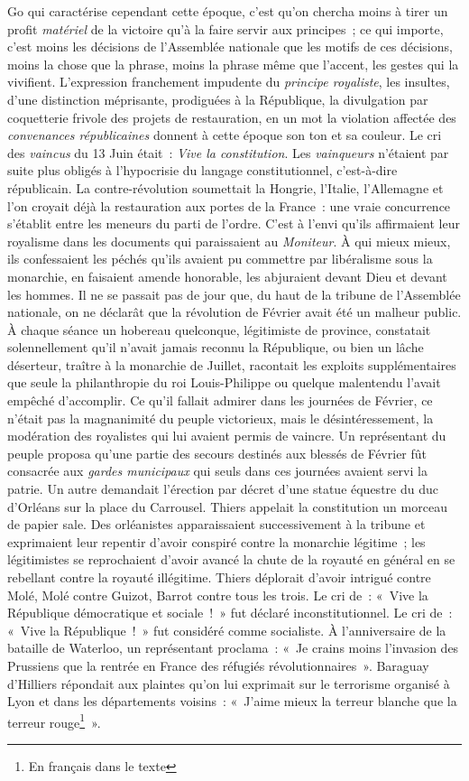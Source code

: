 \documentclass[twoside]{book} %
\begin{document}
Go qui caractérise cependant cette époque, c’est qu’on chercha moins à tirer un profit \emph{matériel} de la victoire qu’à la faire servir aux principes ; ce qui importe, c’est moins les décisions de l’Assemblée nationale que les motifs de ces décisions, moins la chose que la phrase, moins la phrase même que l’accent, les gestes qui la vivifient. L’expression franchement impudente du \emph{principe royaliste}, les insultes, d’une distinction méprisante, prodiguées à la République, la divulgation par coquetterie frivole des projets de restauration, en un mot la violation affectée des \emph{convenances républicaines} donnent à cette époque son ton et sa couleur. Le cri des \emph{vaincus} du 13 Juin était : \emph{Vive la constitution}. Les \emph{vainqueurs} n’étaient par suite plus obligés à l’hypocrisie du langage constitutionnel, c’est-à-dire républicain. La contre-révolution soumettait la Hongrie, l’Italie, l’Allemagne et l’on croyait déjà la restauration aux portes de la France : une vraie concurrence s’établit entre les meneurs du parti de l’ordre. C’est à l’envi qu’ils affirmaient leur royalisme dans les documents qui paraissaient au \emph{Moniteur}. À qui mieux mieux, ils confessaient les péchés qu’ils avaient pu commettre par libéralisme sous la monarchie, en faisaient amende honorable, les abjuraient devant Dieu et devant les hommes. Il ne se passait pas de jour que, du haut de la tribune de l’Assemblée nationale, on ne déclarât que la révolution de Février avait été un malheur public. À chaque séance un hobereau quelconque, légitimiste de province, constatait solennellement qu’il n’avait jamais reconnu la République, ou bien un lâche déserteur, traître à la monarchie de Juillet, racontait les exploits supplémentaires que seule la philanthropie du roi Louis-Philippe ou quelque malentendu l’avait empêché d’accomplir. Ce qu’il fallait admirer dans les journées de Février, ce n’était pas la magnanimité du peuple victorieux, mais le désintéressement, la modération des royalistes qui lui avaient permis de vaincre. Un représentant du peuple proposa qu’une partie des secours destinés aux blessés de Février fût consacrée aux \emph{gardes municipaux} qui seuls dans ces journées avaient servi la patrie. Un autre demandait l’érection par décret d’une statue équestre du duc d’Orléans sur la place du Carrousel. Thiers appelait la constitution un morceau de papier sale. Des orléanistes apparaissaient successivement à la tribune et exprimaient leur repentir d’avoir conspiré contre la monarchie légitime ; les légitimistes se reprochaient d’avoir avancé la chute de la royauté en général en se rebellant contre la royauté illégitime. Thiers déplorait d’avoir intrigué contre Molé, Molé contre Guizot, Barrot contre tous les trois. Le cri de : « Vive la République démocratique et sociale ! » fut déclaré inconstitutionnel. Le cri de : « Vive la République ! » fut considéré comme socialiste. À l’anniversaire de la bataille de Waterloo, un représentant proclama : « Je crains moins l’invasion des Prussiens que la rentrée en France des réfugiés révolutionnaires ». Baraguay d’Hilliers répondait aux plaintes qu’on lui exprimait sur le terrorisme organisé à Lyon et dans les départements voisins : « J’aime mieux la terreur blanche que la terreur rouge\footnote{En français dans le texte} ». 
\end{document}
